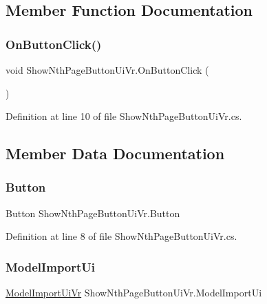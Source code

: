 \subsection{Member Function Documentation}
\mbox{\label{class_show_nth_page_button_ui_vr_abc78e23efec1c960ebe9b2d6e3c5ccfc}} 
\subsubsection{\texorpdfstring{OnButtonClick()}{OnButtonClick()}}
{\footnotesize\ttfamily void Show\+Nth\+Page\+Button\+Ui\+Vr.\+On\+Button\+Click (\begin{DoxyParamCaption}{ }\end{DoxyParamCaption})}



Definition at line 10 of file Show\+Nth\+Page\+Button\+Ui\+Vr.\+cs.



\subsection{Member Data Documentation}
\mbox{\label{class_show_nth_page_button_ui_vr_ae324d65614f056d2ffa67a8315dc7d15}} 
\subsubsection{\texorpdfstring{Button}{Button}}
{\footnotesize\ttfamily Button Show\+Nth\+Page\+Button\+Ui\+Vr.\+Button}



Definition at line 8 of file Show\+Nth\+Page\+Button\+Ui\+Vr.\+cs.

\mbox{\label{class_show_nth_page_button_ui_vr_a0acbdf8d5d99979fd48ed1909aa5c36f}} 
\subsubsection{\texorpdfstring{ModelImportUi}{ModelImportUi}}
{\footnotesize\ttfamily \mbox{\hyperlink{class_model_import_ui_vr}{Model\+Import\+Ui\+Vr}} Show\+Nth\+Page\+Button\+Ui\+Vr.\+Model\+Import\+Ui}



